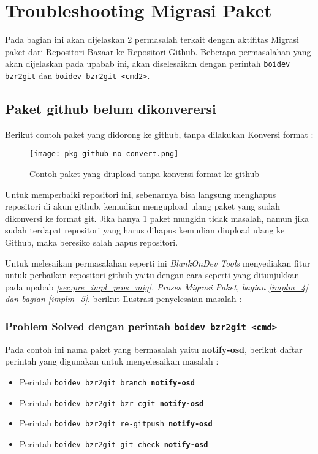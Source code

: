 \pagestyle{fancy}
\fancyhf{}
\fancyhead[LE]{\thepage}
\fancyhead[RO]{\thepage}
\fancyhead[RE]{\nouppercase{\textbf{\leftmark}}}
\setlength{\parindent}{1cm}
\setlength{\parskip}{0.25cm}

\chapter{Troubleshooting Migrasi Paket}
\label{chap:trouble_mig}

Pada bagian ini akan dijelaskan 2 permasalah terkait dengan aktifitas Migrasi paket dari Repositori Bazaar ke Repositori Github. Beberapa permasalahan yang akan dijelaskan pada upabab ini, akan diselesaikan dengan perintah \texttt{boidev bzr2git} dan \texttt{boidev bzr2git <cmd2>}.

\section{Paket github belum dikonverersi}
\label{sec:pkg-github-no-convert}
\noindent
Berikut contoh paket yang didorong ke github, tanpa dilakukan Konversi format :

\begin{figure}[H]
	\centering
	\texttt{[image: pkg-github-no-convert.png]}
	\caption{Contoh paket yang diupload tanpa konversi format ke github}
	\label{fig:bab3_pkg-gihub-no-convert}
\end{figure}

\noindent
Untuk memperbaiki repositori ini, sebenarnya bisa langsung menghapus repositori di akun github, kemudian mengupload ulang paket yang sudah dikonversi ke format git. Jika hanya 1 paket mungkin tidak masalah, namun jika sudah terdapat repositori yang harus dihapus kemudian diupload ulang ke Github, maka beresiko salah hapus repositori. 

\noindent
Untuk melesaikan permasalahan seperti ini \textit{BlankOnDev Tools} menyediakan fitur untuk perbaikan repositori github yaitu dengan cara seperti yang ditunjukkan pada upabab \textit{\ref{sec:pre_impl_pros_mig}. Proses Migrasi Paket, bagian \ref{implm_4} dan bagian \ref{implm_5}}. berikut Ilustrasi penyelesaian masalah :

\subsection{Problem Solved dengan perintah \texttt{boidev bzr2git <cmd>}}
\label{sec:problem-solved1}
\noindent
Pada contoh ini nama paket yang bermasalah yaitu \textbf{notify-osd}, berikut daftar perintah yang digunakan untuk menyelesaikan masalah :
\begin{itemize}
	\item Perintah \texttt{boidev bzr2git branch \textbf{notify-osd}}
	\item Perintah \texttt{boidev bzr2git bzr-cgit \textbf{notify-osd}}
	\item Perintah \texttt{boidev bzr2git re-gitpush \textbf{notify-osd}}
	\item Perintah \texttt{boidev bzr2git git-check \textbf{notify-osd}}
\end{itemize}

